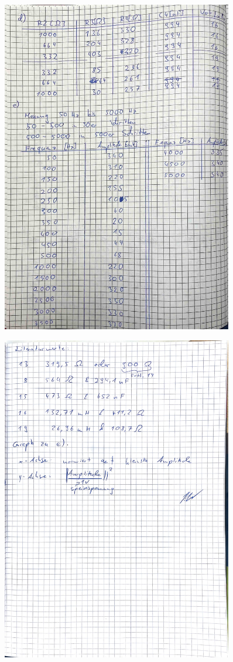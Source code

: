 \begin{figure}[H]
  \centering
  \includegraphics[width=0.90\textwidth]{Messwerte/Messwerte_2.pdf}
  \label{fig:Messungen_2}
\end{figure}
\begin{figure}[H]
  \centering
  \includegraphics[width=0.90\textwidth]{Messwerte/Messwerte_3.pdf}
  \label{fig:Messungen_3}
\end{figure}